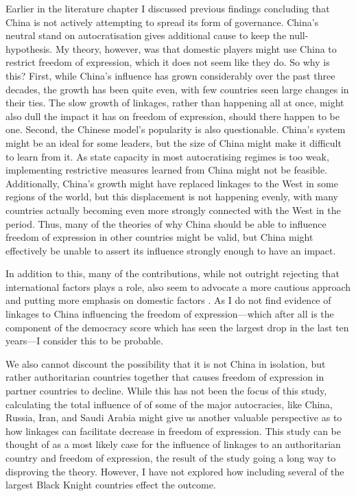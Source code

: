 Earlier in the literature chapter I discussed previous findings concluding that China is not actively attempting to spread its form of governance. China's neutral stand on autocratisation gives additional cause to keep the null-hypothesis. My theory, however, was that domestic players might use China to restrict freedom of expression, which it does not seem like they do. So why is this? First, while China's influence has grown considerably over the past three decades, the growth has been quite even, with few countries seen large changes in their ties. The slow growth of linkages, rather than happening all at once, might also dull the impact it has on freedom of expression, should there happen to be one. Second, the Chinese model's popularity is also questionable. China's system might be an ideal for some leaders, but the size of China might make it difficult to learn from it. As state capacity in most autocratising regimes is too weak, implementing restrictive measures learned from China might not be feasible. Additionally, China's growth might have replaced linkages to the West in some regions of the world, but this displacement is not happening evenly, with many countries actually becoming even more strongly connected with the West in the period. Thus, many of the theories of why China should be able to influence freedom of expression in other countries might be valid, but China might effectively be unable to assert its influence strongly enough to have an impact.

In addition to this, many of the contributions, while not outright rejecting that international factors plays a role, also seem to advocate a more cautious approach and putting more emphasis on domestic factors \citep{bader_china_2015, buzogany_illiberal_2017, risse_democracy_2015}. As I do not find evidence of linkages to China influencing the freedom of expression---which after all is the component of the democracy score which has seen the largest drop in the last ten years---I consider this to be probable. 

We also cannot discount the possibility that it is not China in isolation, but rather authoritarian countries together that causes freedom of expression in partner countries to decline. While this has not been the focus of this study, calculating the total influence of of some of the major autocracies, like China, Russia, Iran, and Saudi Arabia might give us another valuable perspective as to how linkages can facilitate decrease in freedom of expression. This study can be thought of as a most likely case for the influence of linkages to an authoritarian country and freedom of expression, the result of the study going a long way to disproving the theory. However, I have not explored how including several of the largest Black Knight countries effect the outcome. 

